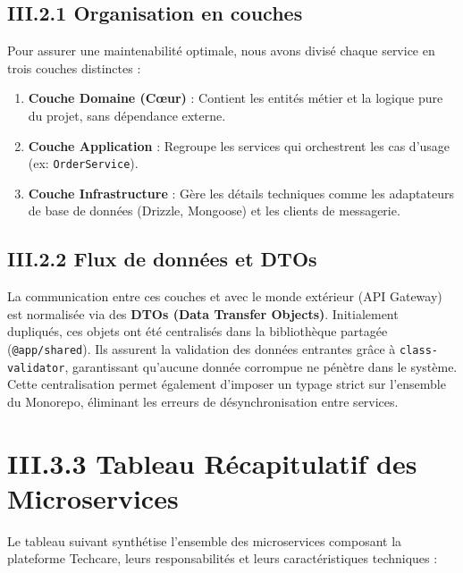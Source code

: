 \subsection{III.2.1 Organisation en couches}
Pour assurer une maintenabilité optimale, nous avons divisé chaque service en trois couches distinctes :
\begin{enumerate}
    \item \textbf{Couche Domaine (Cœur)} : Contient les entités métier et la logique pure du projet, sans dépendance externe.
    \item \textbf{Couche Application} : Regroupe les services qui orchestrent les cas d'usage (ex: \texttt{OrderService}).
    \item \textbf{Couche Infrastructure} : Gère les détails techniques comme les adaptateurs de base de données (Drizzle, Mongoose) et les clients de messagerie.
\end{enumerate}

\subsection{III.2.2 Flux de données et DTOs}
La communication entre ces couches et avec le monde extérieur (API Gateway) est normalisée via des \textbf{DTOs (Data Transfer Objects)}. Initialement dupliqués, ces objets ont été centralisés dans la bibliothèque partagée (\texttt{@app/shared}). Ils assurent la validation des données entrantes grâce à \texttt{class-validator}, garantissant qu'aucune donnée corrompue ne pénètre dans le système. Cette centralisation permet également d'imposer un typage strict sur l'ensemble du Monorepo, éliminant les erreurs de désynchronisation entre services.

\section{III.3.3 Tableau Récapitulatif des Microservices}
\label{sec:recap_services}

Le tableau suivant synthétise l'ensemble des microservices composant la plateforme Techcare, leurs responsabilités et leurs caractéristiques techniques :


